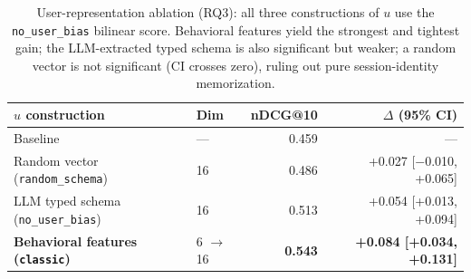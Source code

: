 \begin{table}[t]
\centering
\caption{User-representation ablation (RQ3): all three constructions of $u$ use the \texttt{no\_user\_bias} bilinear score. Behavioral features yield the strongest and tightest gain; the LLM-extracted typed schema is also significant but weaker; a random vector is not significant (CI crosses zero), ruling out pure session-identity memorization.}
\label{tab:representation}
\begin{tabular}{llrr}
\toprule
$u$ construction & Dim & nDCG@10 & $\Delta$ (95\% CI) \\
\midrule
Baseline & --- & 0.459 & --- \\
Random vector (\texttt{random\_schema}) & 16 & 0.486 & +0.027 [$-$0.010, +0.065] \\
LLM typed schema (\texttt{no\_user\_bias}) & 16 & 0.513 & +0.054 [+0.013, +0.094] \\
\textbf{Behavioral features (\texttt{classic})} & 6 $\to$ 16 & \textbf{0.543} & \textbf{+0.084 [+0.034, +0.131]} \\
\bottomrule
\end{tabular}
\end{table}
